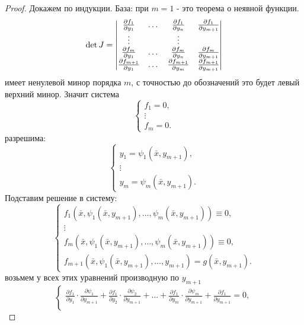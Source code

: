 \begin{proof}
    Докажем по индукции. База: при $m=1$ - это теорема о неявной функции.
    \[
        \det{J}=\begin{vmatrix}
            \frac{\partial {f_1}}{\partial {y_1}} & \dots & \frac{\partial {f_1}}{\partial {y_n}} & \frac{\partial {f_1}}{\partial {y_{m+1}}}\\
            \vdots & \null & \vdots\\
            \frac{\partial {f_m}}{\partial {y_1}} & \dots & \frac{\partial {f_m}}{\partial {y_n}} & \frac{\partial {f_m}}{\partial {y_{m+1}}}\\
            \frac{\partial {f_{m+1}}}{\partial {y_1}} & \dots & \frac{\partial {f_{m+1}}}{\partial {y_m}} & \frac{\partial {f_{m+1}}}{\partial {y_{m+1}}}
        \end{vmatrix}
    \]
    имеет ненулевой минор порядка $m$, с точностью до обозначений это будет левый верхний минор. Значит система
    \[\begin{cases}
        f_1 = 0,\\
        \vdots\\
        f_m=0.
    \end{cases}
    \]
    разрешима:
    \[\begin{cases}
        y_1=\psi_1(\bar{x},y_{m+1}),\\
        \vdots\\
        y_m=\psi_m(\bar{x}, y_{m+1}).
    \end{cases}
    \]
    Подставим решение в систему:
    \[\begin{cases}
        f_1(\bar{x}, \psi_1(\bar{x}, y_{m+1}), \dots, \psi_m(\bar{x}, y_{m+1}))\equiv 0,\\
        \vdots\\
        f_m(\bar{x}, \psi_1(\bar{x}, y_{m+1}), \dots, \psi_m(\bar{x}, y_{m+1}))\equiv 0,\\
        f_{m+1}(\bar{x}, \psi_1(\bar{x}, y_{m+1}),\dots,y_{m+1})=g(\bar{x}, y_{m+1}).
    \end{cases}
    \]
    возьмем у всех этих уравнений производную по $y_{m+1}$
    \[\begin{cases}
        \frac{\partial {f_1}}{\partial {y_1}}\cdot \frac{\partial {\psi_1}}{\partial {y_{m+1}}}+\frac{\partial {f_1}}{\partial {y_2}}\cdot \frac{\partial {\psi_2}}{\partial {y_{m+1}}}+ \dots +\frac{\partial {f_1}}{\partial {y_m}}\cdot \frac{\partial {\psi_m}}{\partial {y_{m+1}}}+\frac{\partial {f_1}}{\partial {y_{m+1}}}=0,\\

\end{cases}\]
\end{proof}
